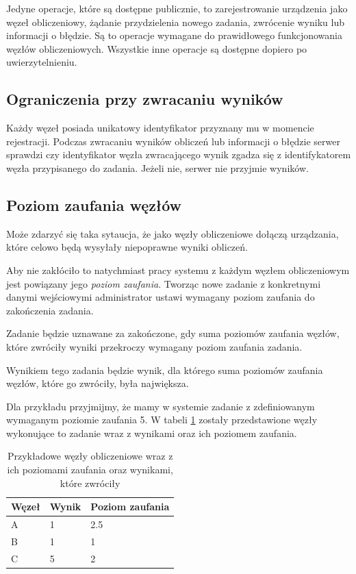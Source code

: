 \documentclass[a4paper,11pt,twoside]{report}
\theoremstyle{definition}
\begin{document}
Jedyne operacje, które są dostępne publicznie, to zarejestrowanie urządzenia jako węzeł obliczeniowy, żądanie przydzielenia nowego zadania, zwrócenie wyniku lub informacji o błędzie. Są to operacje wymagane do prawidłowego funkcjonowania węzłów obliczeniowych. Wszystkie inne operacje są dostępne dopiero po uwierzytelnieniu.

\subsection{Ograniczenia przy zwracaniu wyników}

Każdy węzeł posiada unikatowy identyfikator przyznany mu w momencie rejestracji. Podczas zwracaniu wyników obliczeń lub informacji o błędzie serwer sprawdzi czy identyfikator węzła zwracającego wynik zgadza się z identifykatorem węzła przypisanego do zadania. Jeżeli nie, serwer nie przyjmie wyników.

\subsection{Poziom zaufania węzłów}
\label{poziom-zaufania-wezlow}

Może zdarzyć się taka sytaucja, że jako węzły obliczeniowe dołączą urządzania, które celowo będą wysyłały niepoprawne wyniki obliczeń.

Aby nie zakłóciło to natychmiast pracy systemu z każdym węzłem obliczeniowym jest powiązany jego \textit{poziom zaufania}. Tworząc nowe zadanie z konkretnymi danymi wejściowymi administrator ustawi wymagany poziom zaufania do zakończenia zadania.

Zadanie będzie uznawane za zakończone, gdy suma poziomów zaufania węzłów, które zwróciły wyniki przekroczy wymagany poziom zaufania zadania.

Wynikiem tego zadania będzie wynik, dla którego suma poziomów zaufania węzłów, które go zwróciły, była największa.

Dla przykładu przyjmijmy, że mamy w systemie zadanie z zdefiniowanym wymaganym poziomie zaufania 5. W tabeli \ref{trust-level-example} zostały przedstawione węzły wykonujące to zadanie wraz z wynikami oraz ich poziomem zaufania.

\begin{table}[ht]
	\centering
	\caption{Przykładowe węzły obliczeniowe wraz z ich poziomami zaufania oraz wynikami, które zwróciły}
	\label{trust-level-example}
	\begin{tabular}{|l|l|l|}
		\hline
		Węzeł & Wynik & Poziom zaufania \\ \hline
		A     & 1     & 2.5             \\ \hline
		B     & 1     & 1               \\ \hline
		C     & 5     & 2               \\ \hline
	\end{tabular}
\end{table}
\end{document}
